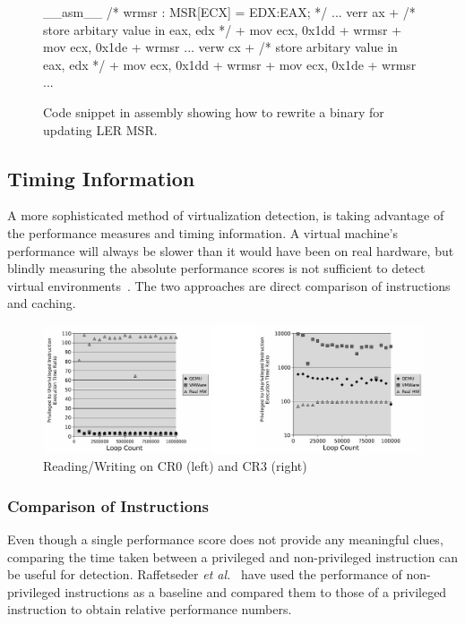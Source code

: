 \begin{figure}[h]
\begin{lstc}
__asm__ {
	/* wrmsr : MSR[ECX] = EDX:EAX; */
	...
	verr ax
+	/* store arbitary value in eax, edx */
+	mov ecx, 0x1dd
+	wrmsr 
+	mov ecx, 0x1de
+	wrmsr
	...
	verw cx
+	/* store arbitary value in eax, edx */
+	mov ecx, 0x1dd
+	wrmsr
+	mov ecx, 0x1de
+	wrmsr
	...
}
\end{lstc}
\caption{\label{fig:wrmsr} Code snippet in assembly showing how to rewrite
  a binary for updating LER MSR.}
\end{figure}

\subsection{Timing Information}
\label{sec:approach-timing}
A more sophisticated method of virtualization detection, is taking advantage of
the performance measures and timing information. A virtual machine's performance
will always be slower than it would have been on real hardware, but blindly
measuring the absolute performance scores is not sufficient to detect virtual
environments~\cite{raffetseder2007}. The two approaches are direct comparison of
instructions and caching.

\begin{figure}[!t]
	\centering
	\includegraphics[width=\textwidth]{figure/comp_inst.jpg}
	\caption{Reading/Writing on CR0 (left) and CR3 (right)}
	\label{fig:comparison_of_instructions}
\end{figure}

\subsubsection{Comparison of Instructions}
Even though a single performance score does not provide any meaningful clues,
comparing the time taken between a privileged and non-privileged instruction can
be useful for detection. Raffetseder {\em et al.}~\cite{raffetseder2007} have
used the performance of non-privileged instructions as a baseline and compared
them to those of a privileged instruction to obtain relative performance numbers.

